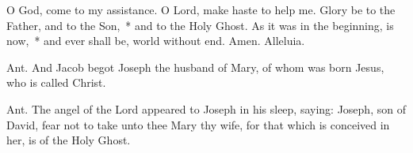 \documentclass[12pt]{book}
\begin{document}
 
 \twosided[pc] %
 
  \thispagestyle{empty}
 
 {\par}
 \vspace{0.5\baselineskip}
 
{\par}

\vspace{0.25\baselineskip}

{\par}




\noindent
\begin{enpars}
O God, \cc{} come to my assistance. \rr O Lord, make haste to help me. Glory be to the Father, and to the Son,~* and to the Holy Ghost. As it was in the beginning, is now,~* and ever shall be, world without end. Amen. Alleluia.\end{enpars}


\begin{enpars} \noindent Ant. And Jacob begot Joseph the husband of Mary, of whom was born Jesus, who is called Christ. \end{enpars}



 
 \begin{enpars} \noindent Ant. The angel of the Lord appeared to Joseph in his sleep, saying: Joseph, son of David, fear not to take unto thee Mary thy wife, for that which is conceived in her, is of the Holy Ghost. \end{enpars}
\end{document}
